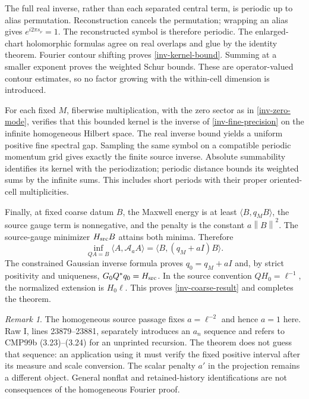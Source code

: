 \documentclass[11pt]{article}
\theoremstyle{remark}
\newtheorem{remark}[theorem]{Remark}
\newcommand{\norm}[1]{\left\|#1\right\|}
\begin{document}
The full real inverse, rather than each separated central term, is
periodic up to alias permutation. Reconstruction cancels the
permutation; wrapping an alias gives $e^{i2\pi s_\nu}=1$. The
reconstructed symbol is therefore periodic. The enlarged-chart
holomorphic formulas agree on real overlaps and glue by the identity
theorem. Fourier contour shifting proves \eqref{inv-kernel-bound}.
Summing at a smaller exponent proves the weighted Schur bounds.
These are operator-valued contour estimates, so no factor growing
with the within-cell dimension is introduced.

For each fixed $M$, fiberwise multiplication, with the zero sector
as in \eqref{inv-zero-mode}, verifies that this bounded kernel is
the inverse of \eqref{inv-fine-precision} on the infinite homogeneous
Hilbert space. The real inverse bound yields a uniform positive fine
spectral gap. Sampling the same symbol on a compatible periodic
momentum grid gives exactly the finite source inverse. Absolute
summability identifies its kernel with the periodization; periodic
distance bounds its weighted sums by the infinite sums. This includes
short periods with their proper oriented-cell multiplicities.

Finally, at fixed coarse datum $B$, the Maxwell energy is at least
$\langle B,q_MB\rangle$, the source gauge term is nonnegative, and
the penalty is the constant $a\norm{B}^2$. The source-gauge minimizer
$H_{\rm src}B$ attains both minima. Therefore
\[
 \inf_{QA=B}\langle A,\mathcal A_aA\rangle
   =\langle B,(q_M+aI)B\rangle.
\]
The constrained Gaussian inverse formula proves
$q_0=q_M+aI$ and, by strict positivity and uniqueness,
$G_0Q^*q_0=H_{\rm src}$. In the source convention
$QH_0=\ell^{-1}$, the normalized extension is $H_0\ell$.
This proves \eqref{inv-coarse-result} and completes the theorem.

\begin{remark}\label{inv-scope}
The homogeneous source passage fixes $a=\ell^{-2}$ and hence $a=1$
here. Raw I, lines 23879--23881, separately introduces an $a_n$
sequence and refers to CMP99b (3.23)--(3.24) for an unprinted recursion.
The theorem does not guess that sequence: an application using it
must verify the fixed positive interval after its measure and scale
conversion. The scalar penalty $a'$ in the projection remains a
different object. General nonflat and retained-history identifications
are not consequences of the homogeneous Fourier proof.
\end{remark}
\end{document}
